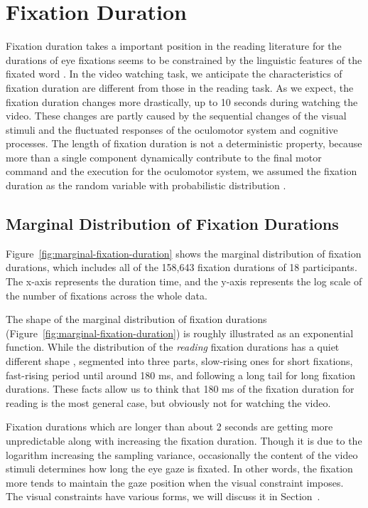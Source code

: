 \documentclass[oneside,master]{snueethesis}
\begin{document}
\chapter{Fixation Duration}
\label{sec:fixation-duration}

Fixation duration takes a important position in the reading literature for the durations of eye fixations seems to be constrained by the linguistic features of the fixated word \cite{Rayner1986,Inhoff1986}. In the video watching task, we anticipate the characteristics of fixation duration are different from those in the reading task. As we expect, the fixation duration changes more drastically, up to 10 seconds during watching the video. These changes are partly caused by the sequential changes of the visual stimuli and the fluctuated responses of the oculomotor system and cognitive processes. The length of fixation duration is not a deterministic property, because more than a single component dynamically contribute to the final motor command and the execution for the oculomotor system, we assumed the fixation duration as the random variable with probabilistic distribution \cite{Rayner1998,Reichle2004,Reichle2006}.


\section{Marginal Distribution of Fixation Durations}

Figure~\ref{fig:marginal-fixation-duration} shows the marginal distribution of fixation durations, which includes all of the 158,643 fixation durations of 18 participants. The x-axis represents the duration time, and the y-axis represents the log scale of the number of fixations across the whole data.

The shape of the marginal distribution of fixation durations (Figure~\ref{fig:marginal-fixation-duration}) is roughly illustrated as an exponential function. While the distribution of the \textit{reading} fixation durations has a quiet different shape \cite{Feng2006}, segmented into three parts, slow-rising ones for short fixations, fast-rising period until around 180 ms, and following a long tail for long fixation durations. These facts allow us to think that 180 ms of the fixation duration for reading is the most general case, but obviously not for watching the video.

Fixation durations which are longer than about 2 seconds are getting more unpredictable along with increasing the fixation duration. Though it is due to the logarithm increasing the sampling variance, occasionally the content of the video stimuli determines how long the eye gaze is fixated. In other words, the fixation more tends to maintain the gaze position when the visual constraint imposes. The visual constraints have various forms, we will discuss it in Section~.
\end{document}
